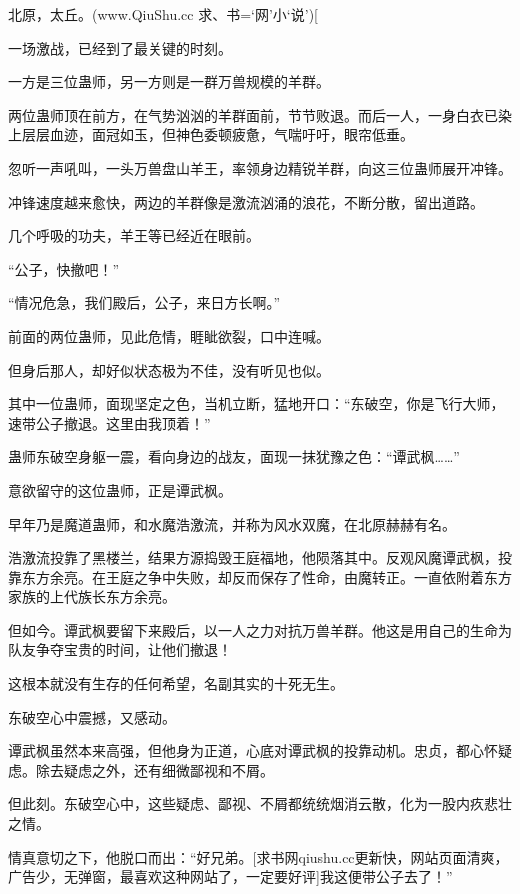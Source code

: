 
\begin{this_body}

北原，太丘。(www.QiuShu.cc 求、书=‘网’小‘说’)[

一场激战，已经到了最关键的时刻。

一方是三位蛊师，另一方则是一群万兽规模的羊群。

两位蛊师顶在前方，在气势汹汹的羊群面前，节节败退。而后一人，一身白衣已染上层层血迹，面冠如玉，但神色委顿疲惫，气喘吁吁，眼帘低垂。

忽听一声吼叫，一头万兽盘山羊王，率领身边精锐羊群，向这三位蛊师展开冲锋。

冲锋速度越来愈快，两边的羊群像是激流汹涌的浪花，不断分散，留出道路。

几个呼吸的功夫，羊王等已经近在眼前。

“公子，快撤吧！”

“情况危急，我们殿后，公子，来日方长啊。”

前面的两位蛊师，见此危情，睚眦欲裂，口中连喊。

但身后那人，却好似状态极为不佳，没有听见也似。

其中一位蛊师，面现坚定之色，当机立断，猛地开口：“东破空，你是飞行大师，速带公子撤退。这里由我顶着！”

蛊师东破空身躯一震，看向身边的战友，面现一抹犹豫之色：“谭武枫……”

意欲留守的这位蛊师，正是谭武枫。

早年乃是魔道蛊师，和水魔浩激流，并称为风水双魔，在北原赫赫有名。

浩激流投靠了黑楼兰，结果方源捣毁王庭福地，他陨落其中。反观风魔谭武枫，投靠东方余亮。在王庭之争中失败，却反而保存了性命，由魔转正。一直依附着东方家族的上代族长东方余亮。

但如今。谭武枫要留下来殿后，以一人之力对抗万兽羊群。他这是用自己的生命为队友争夺宝贵的时间，让他们撤退！

这根本就没有生存的任何希望，名副其实的十死无生。

东破空心中震撼，又感动。

谭武枫虽然本来高强，但他身为正道，心底对谭武枫的投靠动机。忠贞，都心怀疑虑。除去疑虑之外，还有细微鄙视和不屑。

但此刻。东破空心中，这些疑虑、鄙视、不屑都统统烟消云散，化为一股内疚悲壮之情。

情真意切之下，他脱口而出：“好兄弟。[求书网qiushu.cc更新快，网站页面清爽，广告少，无弹窗，最喜欢这种网站了，一定要好评]我这便带公子去了！”


\end{this_body}
